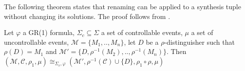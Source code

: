 The following theorem states that renaming can be applied to a synthesis tuple without changing its solutions.  The proof follows from \cite{mohajerani_framework_2014}.

\begin{theorem}
    Let $\varphi$ a GR(1) formula, $\Sigma_c \subseteq \Sigma$ a set of controllable events, $\mu$ a set of uncontrollable events, $\mathcal{M} = \{ M_1, .., M_n \}$, let $D$ be a $\rho$-distinguisher such that $\rho(D)=M_1$ and $\mathcal{M'} = \{ D, \rho^{-1}(M_2), .., \rho^{-1}(M_n) \}$. Then $(\mathcal{M}, \mathcal{C}, \rho_{1}, \mu) \cong_{\Sigma_c, \varphi} (\mathcal{M'}, \rho^{-1}(\mathcal{C}) \cup \{ D \}, \rho_{1} \circ \rho, \mu)$
\end{theorem}
